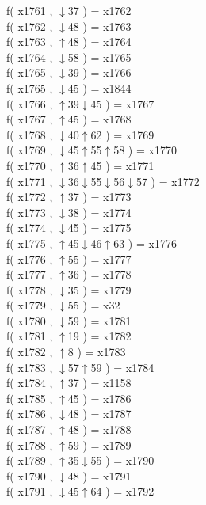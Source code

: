 f( x1761 , $\downarrow$37 ) = x1762 \\
f( x1762 , $\downarrow$48 ) = x1763 \\
f( x1763 , $\uparrow$48 ) = x1764 \\
f( x1764 , $\downarrow$58 ) = x1765 \\
f( x1765 , $\downarrow$39 ) = x1766 \\
f( x1765 , $\downarrow$45 ) = x1844 \\
f( x1766 , $\uparrow$39$\downarrow$45 ) = x1767 \\
f( x1767 , $\uparrow$45 ) = x1768 \\
f( x1768 , $\downarrow$40$\uparrow$62 ) = x1769 \\
f( x1769 , $\downarrow$45$\uparrow$55$\uparrow$58 ) = x1770 \\
f( x1770 , $\uparrow$36$\uparrow$45 ) = x1771 \\
f( x1771 , $\downarrow$36$\downarrow$55$\downarrow$56$\downarrow$57 ) = x1772 \\
f( x1772 , $\uparrow$37 ) = x1773 \\
f( x1773 , $\downarrow$38 ) = x1774 \\
f( x1774 , $\downarrow$45 ) = x1775 \\
f( x1775 , $\uparrow$45$\downarrow$46$\uparrow$63 ) = x1776 \\
f( x1776 , $\uparrow$55 ) = x1777 \\
f( x1777 , $\uparrow$36 ) = x1778 \\
f( x1778 , $\downarrow$35 ) = x1779 \\
f( x1779 , $\downarrow$55 ) = x32 \\
f( x1780 , $\downarrow$59 ) = x1781 \\
f( x1781 , $\uparrow$19 ) = x1782 \\
f( x1782 , $\uparrow$8 ) = x1783 \\
f( x1783 , $\downarrow$57$\uparrow$59 ) = x1784 \\
f( x1784 , $\uparrow$37 ) = x1158 \\
f( x1785 , $\uparrow$45 ) = x1786 \\
f( x1786 , $\downarrow$48 ) = x1787 \\
f( x1787 , $\uparrow$48 ) = x1788 \\
f( x1788 , $\uparrow$59 ) = x1789 \\
f( x1789 , $\uparrow$35$\downarrow$55 ) = x1790 \\
f( x1790 , $\downarrow$48 ) = x1791 \\
f( x1791 , $\downarrow$45$\uparrow$64 ) = x1792 \\
